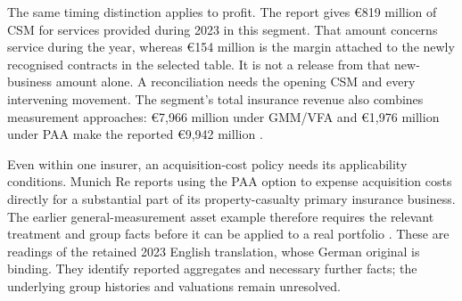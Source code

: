 The same timing distinction applies to profit. The report gives
€819 million of CSM for services provided during 2023 in this segment.
That amount concerns service during the year, whereas €154 million is
the margin attached to the newly recognised contracts in the selected table.
It is not a release from that new-business amount alone. A reconciliation
needs the opening CSM and every intervening movement. The segment's total
insurance revenue also combines measurement approaches: €7,966 million
under GMM/VFA and €1,976 million under PAA make the reported
€9,942 million \citep[printed pp. 253, 264]{munichre2023annual}.

Even within one insurer, an acquisition-cost policy needs its applicability
conditions. Munich Re reports using the PAA option to expense acquisition
costs directly for a substantial part of its property-casualty primary
insurance business. The earlier general-measurement asset example therefore
requires the relevant treatment and group facts before it can be applied to
a real portfolio \citep[printed p. 166]{munichre2023annual}. These are readings
of the retained 2023 English translation, whose German original is binding.
They identify reported aggregates and necessary further facts; the underlying
group histories and valuations remain unresolved.

\clearpage
